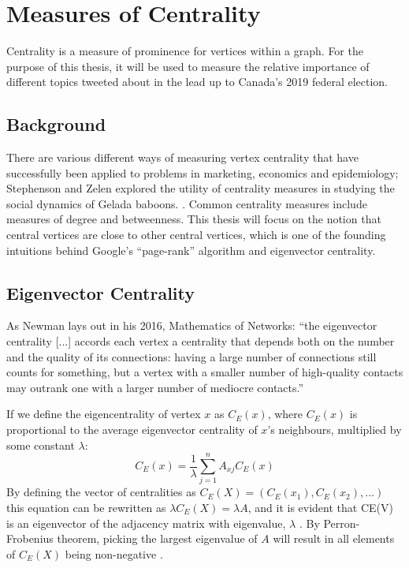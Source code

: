 \section{Measures of Centrality}

Centrality is a measure of prominence for vertices within a graph. For the
purpose of this thesis, it will be used to measure the relative importance of
different topics tweeted about in the lead up to Canada's 2019 federal election.

\subsection{Background}\label{sec:CentralityBackground}

There are various different ways of measuring vertex centrality that have
successfully been applied to problems in marketing, economics and epidemiology;
Stephenson and Zelen explored the utility of centrality measures in studying the
social dynamics of Gelada baboons. \cite{stephenson1989rethinking}. Common
centrality measures include measures of degree and betweenness. This thesis will
focus on the notion that central vertices are close to other central vertices,
which is one of the founding intuitions behind Google’s “page-rank” algorithm
and eigenvector centrality. 

\subsection{Eigenvector Centrality}\label{sec:EigCentrality}

As Newman lays out in his 2016, Mathematics of Networks: ``the eigenvector
centrality [...] accords each vertex a centrality that depends both on the
number and the quality of its connections: having a large number of connections
still counts for something, but a vertex with a smaller number of high-quality
contacts may outrank one with a larger number of mediocre contacts.''
\cite{newman2008mathematics}

If we define the eigencentrality of vertex $x$ as $C_{E}(x)$, where $C_{E}(x)$
is proportional to the average eigenvector centrality of $x$'s neighbours,
multiplied by some constant $\lambda$:
\begin{equation}
    C_{E}(x)=\frac{1}{\lambda}\sum_{j=1}^{n}A_{xj}C_{E}(x)
\end{equation}
By defining the vector of centralities as $C_E(X) = (C_E(x_1),C_E(x_2),...)$
this equation can be rewritten as $\lambda C_E(X) = \lambda A$, and it is
evident that CE(V) is an eigenvector of the adjacency matrix with eigenvalue,
$\lambda$ \cite{newman2008mathematics}. By Perron-Frobenius theorem, picking the
largest eigenvalue of $A$ will result in all elements of $C_E(X)$ being
non-negative \cite{newman2008mathematics}.